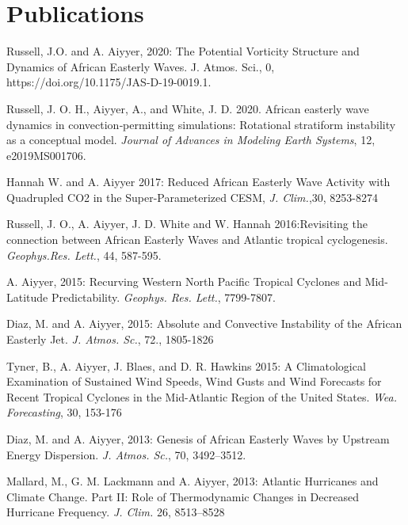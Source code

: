 \section*{Publications}

\begin{ilist}
  
\item Russell, J.O. and A. Aiyyer, 2020: The Potential Vorticity Structure and Dynamics of African Easterly Waves. J. Atmos. Sci., 0, https://doi.org/10.1175/JAS-D-19-0019.1.

\item Russell, J. O. H., Aiyyer, A., and White, J. D. 2020. African easterly wave dynamics in convection‐permitting simulations: Rotational stratiform instability as a conceptual model. \emph{Journal of Advances in Modeling Earth Systems}, 12, e2019MS001706.
  
\item Hannah W. and A. Aiyyer 2017: Reduced African Easterly Wave Activity with Quadrupled
  CO2 in the Super-Parameterized CESM, \emph{J. Clim.},30, 8253-8274

\item Russell, J. O., A. Aiyyer, J. D. White and W. Hannah 2016:Revisiting the connection between African Easterly Waves and Atlantic tropical cyclogenesis.  \emph{Geophys.Res. Lett.}, 44, 587-595.

\item A. Aiyyer, 2015: Recurving Western North Pacific Tropical Cyclones and Mid-Latitude Predictability. \emph{Geophys. Res. Lett.}, 7799-7807.

\item Diaz, M. and A. Aiyyer, 2015: Absolute and Convective Instability of the African Easterly Jet. \emph{J. Atmos. Sc.}, 72., 1805-1826
  
\item Tyner, B., A. Aiyyer, J. Blaes, and D. R. Hawkins 2015: A Climatological Examination of
Sustained Wind Speeds, Wind Gusts and Wind Forecasts for Recent Tropical Cyclones in the
Mid-Atlantic Region of the United States. \emph{Wea. Forecasting}, 30, 153-176


\item Diaz, M. and A. Aiyyer, 2013: Genesis of African Easterly Waves by Upstream Energy Dispersion. \emph{J. Atmos. Sc.}, 70, 3492–3512. 

\item Mallard, M., G. M. Lackmann and A. Aiyyer, 2013: Atlantic Hurricanes and Climate Change. Part II: Role of Thermodynamic Changes in Decreased Hurricane Frequency. \emph{J. Clim.} 26, 8513–8528


\end{ilist}
